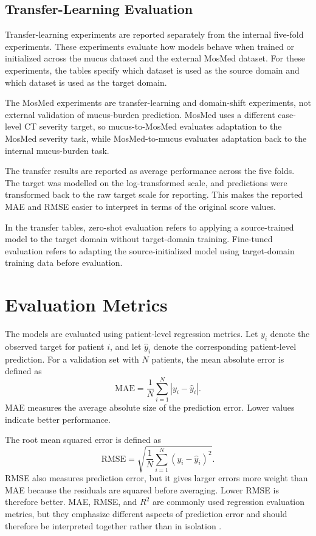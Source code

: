 \subsection{Transfer-Learning Evaluation}
\label{sec:transfer_learning_evaluation_protocol}

Transfer-learning experiments are reported separately from the internal five-fold experiments. These experiments evaluate how models behave when trained or initialized across the mucus dataset and the external MosMed dataset. For these experiments, the tables specify which dataset is used as the source domain and which dataset is used as the target domain.

The MosMed experiments are transfer-learning and domain-shift experiments, not external validation of mucus-burden prediction. MosMed uses a different case-level CT severity target, so mucus-to-MosMed evaluates adaptation to the MosMed severity task, while MosMed-to-mucus evaluates adaptation back to the internal mucus-burden task.

The transfer results are reported as average performance across the five folds. The target was modelled on the log-transformed scale, and predictions were transformed back to the raw target scale for reporting. This makes the reported MAE and RMSE easier to interpret in terms of the original score values.

In the transfer tables, zero-shot evaluation refers to applying a source-trained model to the target domain without target-domain training. Fine-tuned evaluation refers to adapting the source-initialized model using target-domain training data before evaluation.



\section{Evaluation Metrics}
\label{sec:results_metrics}

The models are evaluated using patient-level regression metrics. Let \(y_i\) denote the observed target for patient \(i\), and let \(\hat{y}_i\) denote the corresponding patient-level prediction. For a validation set with \(N\) patients, the mean absolute error is defined as
\[
\mathrm{MAE}
=
\frac{1}{N}
\sum_{i=1}^{N}
|y_i-\hat{y}_i|.
\]
MAE measures the average absolute size of the prediction error. Lower values indicate better performance.

The root mean squared error is defined as
\[
\mathrm{RMSE}
=
\sqrt{
\frac{1}{N}
\sum_{i=1}^{N}
(y_i-\hat{y}_i)^2
}.
\]
RMSE also measures prediction error, but it gives larger errors more weight than MAE because the residuals are squared before averaging. Lower RMSE is therefore better. MAE, RMSE, and \(R^2\) are commonly used regression evaluation metrics, but they emphasize different aspects of prediction error and should therefore be interpreted together rather than in isolation \cite{chicco2021coefficient}.

